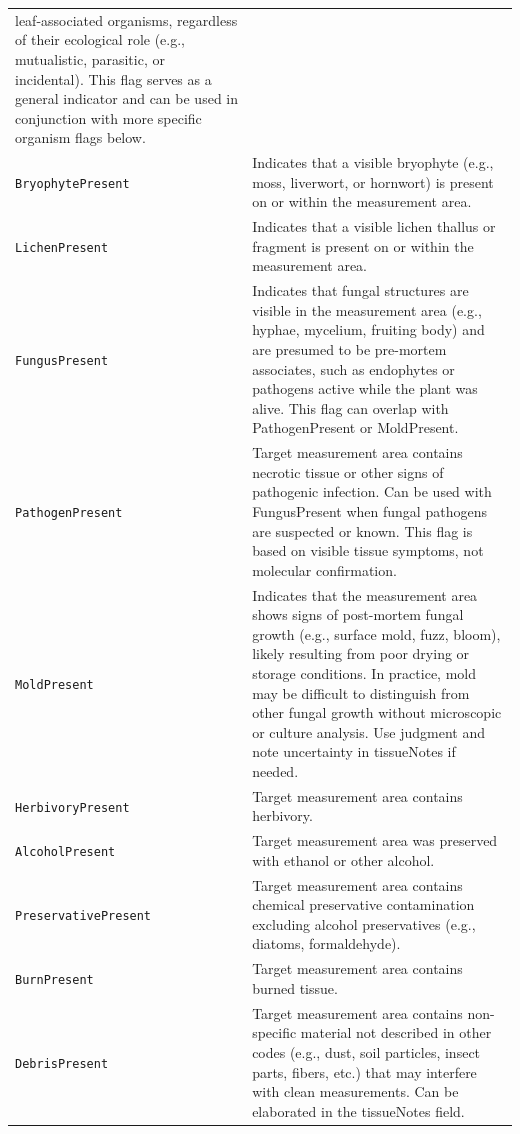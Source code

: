 \documentclass[
  letterpaper,
  DIV=11,
  numbers=noendperiod]{scrreprt}
\begin{document}
\begin{longtable}[]{@{}
  >{\raggedright\arraybackslash}p{}
  >{\raggedright\arraybackslash}p{}@{}}
leaf-associated organisms, regardless of their ecological role (e.g.,
mutualistic, parasitic, or incidental). This flag serves as a general
indicator and can be used in conjunction with more specific organism
flags below. \\
\texttt{BryophytePresent} & Indicates that a visible bryophyte (e.g.,
moss, liverwort, or hornwort) is present on or within the measurement
area. \\
\texttt{LichenPresent} & Indicates that a visible lichen thallus or
fragment is present on or within the measurement area. \\
\texttt{FungusPresent} & Indicates that fungal structures are visible in
the measurement area (e.g., hyphae, mycelium, fruiting body) and are
presumed to be pre-mortem associates, such as endophytes or pathogens
active while the plant was alive. This flag can overlap with
PathogenPresent or MoldPresent. \\
\texttt{PathogenPresent} & Target measurement area contains necrotic
tissue or other signs of pathogenic infection. Can be used with
FungusPresent when fungal pathogens are suspected or known. This flag is
based on visible tissue symptoms, not molecular confirmation. \\
\texttt{MoldPresent} & Indicates that the measurement area shows signs
of post-mortem fungal growth (e.g., surface mold, fuzz, bloom), likely
resulting from poor drying or storage conditions. In practice, mold may
be difficult to distinguish from other fungal growth without microscopic
or culture analysis. Use judgment and note uncertainty in tissueNotes if
needed. \\
\texttt{HerbivoryPresent} & Target measurement area contains
herbivory. \\
\texttt{AlcoholPresent} & Target measurement area was preserved with
ethanol or other alcohol. \\
\texttt{PreservativePresent} & Target measurement area contains chemical
preservative contamination excluding alcohol preservatives (e.g.,
diatoms, formaldehyde). \\
\texttt{BurnPresent} & Target measurement area contains burned
tissue. \\
\texttt{DebrisPresent} & Target measurement area contains non-specific
material not described in other codes (e.g., dust, soil particles,
insect parts, fibers, etc.) that may interfere with clean measurements.
Can be elaborated in the tissueNotes field. \\
\end{longtable}
\end{document}
